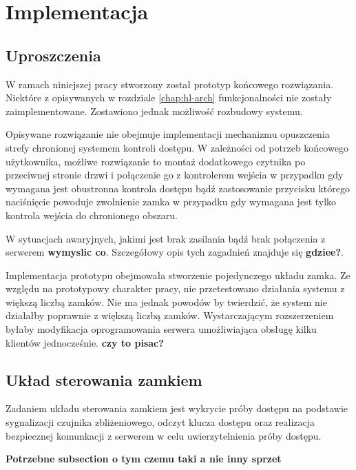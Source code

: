 \chapter{Implementacja}
\label{chap:implementation}

\section{Uproszczenia}

    W ramach niniejszej pracy stworzony został prototyp końcowego rozwiązania. Niektóre z opisywanych w rozdziale \ref{chap:hl-arch} funkcjonalności nie zostały zaimplementowane. Zostawiono jednak możliwość rozbudowy systemu.

    Opisywane rozwiązanie nie obejmuje implementacji mechanizmu opuszczenia strefy chronionej systemem kontroli dostępu. W zależności od potrzeb końcowego użytkownika, możliwe rozwiązanie to montaż dodatkowego czytnika po przeciwnej stronie drzwi i połączenie go z kontrolerem wejścia w przypadku gdy wymagana jest obustronna kontrola dostępu bądź zastosowanie przycisku którego naciśnięcie powoduje zwolnienie zamka w przypadku gdy wymagana jest tylko kontrola wejścia do chronionego obszaru.

    W sytuacjach awaryjnych, jakimi jest brak zasilania bądź brak połączenia z serwerem \textbf{wymyslic co}. Szczegółowy opis tych zagadnień znajduje się \textbf{gdziee?}.

    Implementacja prototypu obejmowała stworzenie pojedynczego układu zamka. Ze względu na prototypowy charakter pracy, nie przetestowano działania systemu z większą liczbą zamków. Nie ma jednak powodów by twierdzić, że system nie działałby poprawnie z większą liczbą zamków. Wystarczającym rozszerzeniem byłaby modyfikacja oprogramowania serwera umożliwiająca obsługę kilku klientów jednocześnie. \textbf{czy to pisac?}

\section{Układ sterowania zamkiem}

    Zadaniem układu sterowania zamkiem jest wykrycie próby dostępu na podstawie sygnalizacji czujnika zbliżeniowego, odczyt klucza dostępu oraz realizacja bezpiecznej komunkacji z serwerem w celu uwierzytelnienia próby dostępu.

    \textbf{Potrzebne subsection o tym czemu taki a nie inny sprzet}
